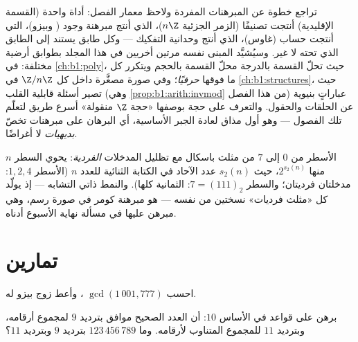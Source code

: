 \begin{remark}\label{rem:b1:arith:interlude}
تراجع خطوة عن المبرهنات المفردة ولاحظ
معمار الفصل: أداة واحدة (القسمة الإقليدية)
أنتجت تصنيفًا (الزمر الجزئية $n\Z$)، الذي أنتج
مبرهنة وجود ( وبيزو)، التي أنتجت حساب
 (غاوس)، الذي أنتج وحدانية التفكيك --- وكل
طابق يستند إلى الطابق الذي تحته لا غير. وسيُشيَّد المبنى
نفسه مرتين أخريين في هذا المجلد بطوابق أرضية مختلفة:
في \cref{ch:b1:poly}، حيث تحلّ القسمة بالدرجة محلّ القسمة
بالحجم ويتكرر كل ما فوقها \emph{حرفيًا}؛ وفي
صورة مصغَّرة داخل كل $\Z/n\Z$ في \cref{ch:b1:structures}،
حيث تصير أسئلة قابلية القلب (وهي
\cref{prop:b1:arith:invmod} من هذا الفصل) عباراتٍ بنيوية عن
الحلقات والحقول. والتعرف على حجة بوصفها «حجة $\Z$
منقولة» أسرع طريق لتعلّم تلك الفصول --- وهو
أول مذاق لعادة الجبر الأساسية، أي البرهان على مبرهنات تخصّ
\emph{بديهيات} لا أغراضًا.
\end{remark}

\begin{omfigure}

{\small الأسطر من $0$ إلى $7$ من مثلث باسكال مع تظليل المدخلات
\emph{الفردية}: يحوي السطر $n$ منها $2^{s_2(n)}$، حيث
$s_2(n)$ عدد الآحاد في الكتابة الثنائية للعدد $n$
(الأسطر $1, 2, 4$: مدخلتان فرديتان؛ والسطر $7 = (111)_2$: الثمانية كلها).
والنمط ذاتي التشابه --- إذ يولّد كل «مثلث فرديات» نسختين
من نفسه --- هو مبرهنة كومر في صورة رسم، وهي مبرهن عليها
في مسألة نهاية الأسبوع أدناه.}
\end{omfigure}

\section{تمارين}

\begin{exercise}[$\star$]\label{exo:b1:arith:1}
احسب $\gcd(1\,001, 777)$ ، وأعط زوج
بيزو له.
\end{exercise}

\begin{exercise}[$\star$]\label{exo:b1:arith:2}
برهن على قواعد  في الأساس $10$: أن العدد الصحيح موافق بترديد
$9$ لمجموع أرقامه، وبترديد $11$ للمجموع المتناوب
لأرقامه. وما $123\,456\,789$ بترديد $9$ وبترديد $11$؟
\end{exercise}

